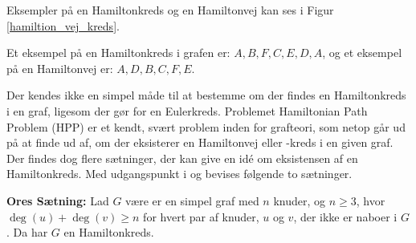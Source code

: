 \begin{exmp}
	Eksempler på en Hamiltonkreds og en Hamiltonvej kan ses i Figur \ref{hamiltion_vej_kreds}.
	
	
	
	Et eksempel på en Hamiltonkreds i grafen er: $A,B,F,C,E,D,A$, og
	et eksempel på en Hamiltonvej er: $A,D,B,C,F,E$.
\end{exmp}

Der kendes ikke en simpel måde til at bestemme om der findes en Hamiltonkreds i en graf, ligesom der gør for en Eulerkreds. 
Problemet Hamiltonian Path Problem (HPP) er et kendt, svært problem inden for grafteori, som netop går ud på at finde ud af, om der eksisterer en Hamiltonvej eller -kreds i en given graf.
Der findes dog flere sætninger, der kan give en idé om eksistensen af en Hamiltonkreds. Med udgangspunkt i \citep{wilson_graph} og \citep{orebevis} bevises følgende to sætninger.



\begin{thm} \label{ores_thm}
	\textbf{Ores Sætning:} 
	Lad $G$ være er en simpel graf med $n$ knuder, og $n\geq3$, hvor $\deg(u)+\deg(v)\geq n$ for hvert par af knuder, $u$ og $v$, der ikke er naboer i $G$. 
	Da har $G$ en Hamiltonkreds. 
\end{thm}

